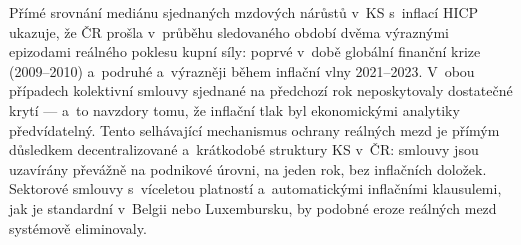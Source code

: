 Přímé srovnání mediánu sjednaných mzdových nárůstů v~\ac{KS} s~inflací \ac{HICP} ukazuje, že ČR prošla v~průběhu sledovaného období dvěma výraznými epizodami reálného poklesu kupní síly: poprvé v~době globální finanční krize (2009--2010) a~podruhé a~výrazněji během inflační vlny 2021--2023.
V~obou případech kolektivní smlouvy sjednané na předchozí rok neposkytovaly dostatečné krytí --- a~to navzdory tomu, že inflační tlak byl ekonomickými analytiky předvídatelný.
Tento selhávající mechanismus ochrany reálných mezd je přímým důsledkem decentralizované a~krátkodobé struktury \ac{KS} v~ČR: smlouvy jsou uzavírány převážně na podnikové úrovni, na jeden rok, bez inflačních doložek.
Sektorové smlouvy s~víceletou platností a~automatickými inflačními klausulemi, jak je standardní v~Belgii nebo Luxembursku, by podobné eroze reálných mezd systémově eliminovaly.



